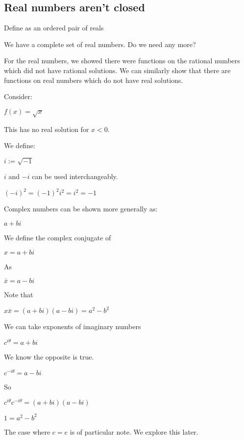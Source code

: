 
\subsection{Real numbers aren't closed}


Define as an ordered pair of reals

We have a complete set of real numbers. Do we need any more?

For the real numbers, we showed there were functions on the rational numbers which did not have rational solutions. We can similarly show that there are functions on real numbers which do not have real solutions.

Consider:

$f(x)=\sqrt x$

This has no real solution for \(x<0\).

We define:

$i:=\sqrt {-1}$

\(i\) and \(-i\) can be used interchangeably.

$(-i)^2=(-1)^2i^2=i^2=-1$

Complex numbers can be shown more generally as:

$a+bi$

We define the complex conjugate of

$x=a+bi$

As

$\bar x=a-bi$

Note that

$x\bar x=(a+bi)(a-bi)=a^2-b^2$

We can take exponents of imaginary numbers

$c^{i\theta}=a+bi$

We know the opposite is true.

$c^{-i\theta}=a-bi$

So

$c^{i\theta}c^{-i\theta}=(a+bi)(a-bi)$

$1=a^2-b^2$

The case where \(c=e\) is of particular note. We explore this later.
